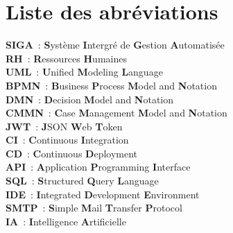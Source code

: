 \chapter*{Liste des abréviations}

\textbf{SIGA} : \textbf{S}ystème \textbf{I}ntergré de \textbf{G}estion \textbf{A}utomatisée\\

\textbf{RH} : \textbf{R}essources \textbf{H}umaines\\

\textbf{UML} : \textbf{U}nified \textbf{M}odeling \textbf{L}anguage\\

\textbf{BPMN} : \textbf{B}usiness \textbf{P}rocess \textbf{M}odel and \textbf{N}otation\\

\textbf{DMN} : \textbf{D}ecision \textbf{M}odel and \textbf{N}otation\\

\textbf{CMMN} : \textbf{C}ase \textbf{M}anagement \textbf{M}odel and \textbf{N}otation\\

\textbf{JWT} : \textbf{J}SON \textbf{W}eb \textbf{T}oken\\

\textbf{CI} : \textbf{C}ontinuous \textbf{I}ntegration\\

\textbf{CD} : \textbf{C}ontinuous \textbf{D}eployment\\

\textbf{API} : \textbf{A}pplication \textbf{P}rogramming \textbf{I}nterface\\

\textbf{SQL} : \textbf{S}tructured \textbf{Q}uery \textbf{L}anguage\\

\textbf{IDE} : \textbf{I}ntegrated \textbf{D}evelopment \textbf{E}nvironment\\

\textbf{SMTP} : \textbf{S}imple \textbf{M}ail \textbf{T}ransfer \textbf{P}rotocol\\

\textbf{IA} : \textbf{I}ntelligence \textbf{A}rtificielle\\